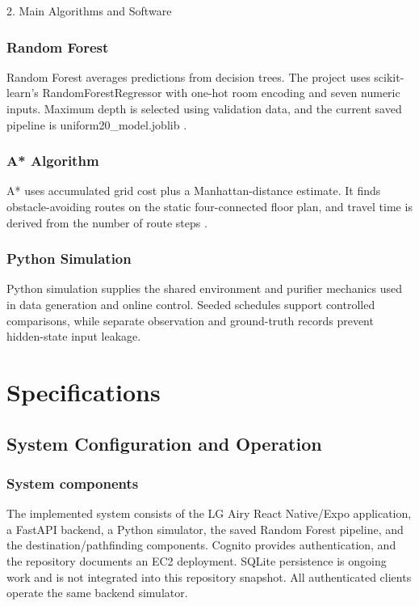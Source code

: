 \documentclass[conference]{IEEEtran}
\begin{document}
2. Main Algorithms and Software

\subsubsection{Random Forest}

Random Forest averages predictions from decision trees. The project uses scikit-learn's RandomForestRegressor with one-hot room encoding and seven numeric inputs. Maximum depth is selected using validation data, and the current saved pipeline is uniform20\_\allowbreak{}model.joblib \cite{ref6,ref13}.

\subsubsection{A* Algorithm}

A* uses accumulated grid cost plus a Manhattan-distance estimate. It finds obstacle-avoiding routes on the static four-connected floor plan, and travel time is derived from the number of route steps \cite{ref12}.

\subsubsection{Python Simulation}

Python simulation supplies the shared environment and purifier mechanics used in data generation and online control. Seeded schedules support controlled comparisons, while separate observation and ground-truth records prevent hidden-state input leakage.

\section{Specifications}

\subsection{System Configuration and Operation}

\subsubsection{System components}

The implemented system consists of the LG Airy React Native/Expo application, a FastAPI backend, a Python simulator, the saved Random Forest pipeline, and the destination/pathfinding components. Cognito provides authentication, and the repository documents an EC2 deployment. SQLite persistence is ongoing work and is not integrated into this repository snapshot. All authenticated clients operate the same backend simulator.
\end{document}
